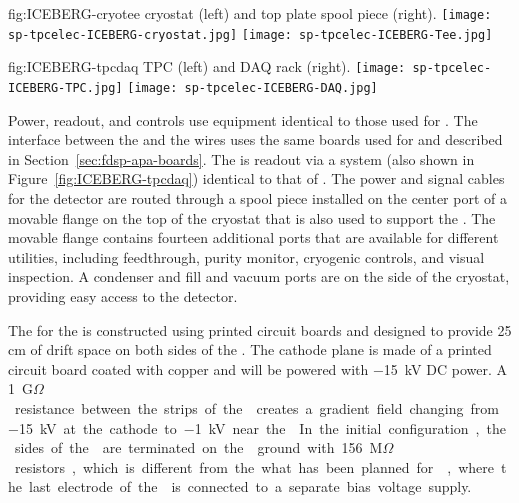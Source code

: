 \begin{dunefigure}
{fig:ICEBERG-cryotee}
{ cryostat (left) and top plate spool piece (right).}
\texttt{[image: sp-tpcelec-ICEBERG-cryostat.jpg]}
\texttt{[image: sp-tpcelec-ICEBERG-Tee.jpg]}
\end{dunefigure}

\begin{dunefigure}
{fig:ICEBERG-tpcdaq}
{ TPC (left) and DAQ rack (right).}
\texttt{[image: sp-tpcelec-ICEBERG-TPC.jpg]}
\texttt{[image: sp-tpcelec-ICEBERG-DAQ.jpg]}
\end{dunefigure}

Power, readout, and controls use equipment identical to those used for . The
interface between the  and the  wires uses the same  boards
used for  and described in Section~\ref{sec:fdsp-apa-boards}. The  is
readout via a  system (also shown in Figure~\ref{fig:ICEBERG-tpcdaq})
identical to that of . The power and signal cables for the detector 
are routed through a spool piece installed on the center port of a movable flange on the 
top of the cryostat that is also used to support the . The movable 
flange contains fourteen additional ports that are available for different utilities, 
including  feedthrough, purity monitor, cryogenic controls, and visual inspection. 
A condenser and  fill and vacuum ports are on the side of the cryostat, 
providing easy access to the detector.

The  for the  is constructed using printed circuit boards and 
designed to provide 25 cm of drift space on both sides of the . The cathode 
plane is made of a printed circuit board coated with copper and will be powered with 
\SI{-15}{kV} DC power. A \SI{1}{G$\Omega$} resistance between the strips of the 
creates a gradient field changing from \SI{-15}{kV} at the cathode to \SI{-1}{kV} near the 
. In the initial configuration, the sides of the  are terminated on the 
ground with \SI{156}{M$\Omega$} resistors, which is different from the what has been
planned for , where the last electrode of the  is connected to
a separate bias voltage supply. 

